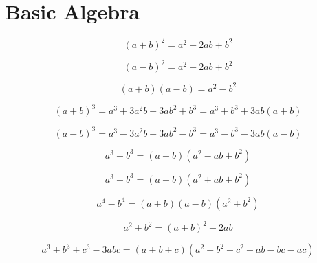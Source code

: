 \section{Basic Algebra}

\begin{equation}
\label{(a+b)2}
(a+b)^2 = a^2 + 2ab + b^2
\end{equation}

\begin{equation}
\label{(a-b)2}
(a-b)^2 = a^2 - 2ab + b^2
\end{equation}

\begin{equation}
\label{(a+b)(a-b)}
(a+b)(a-b) = a^2 - b^2
\end{equation}

\begin{equation}
\label{(a+b)3}
(a+b)^3 = a^3 + 3a^2b + 3ab^2 + b^3 = a^3 + b^3 + 3ab(a+b)
\end{equation}

\begin{equation}
\label{(a-b)3}
(a-b)^3 = a^3 - 3a^2b + 3ab^2 - b^3 = a^3 - b^3 - 3ab(a-b) 
\end{equation}

\begin{equation}
\label{a3+b3}
a^3+b^3 = (a+b)(a^2-ab+b^2) 
\end{equation}

\begin{equation}
\label{a3-b3}
a^3-b^3 = (a-b)(a^2+ab+b^2) 
\end{equation}

\begin{equation}
\label{a4-b4}
a^4-b^4 = (a+b)(a-b)(a^2+b^2) 
\end{equation}

\begin{equation}
\label{a2+b2}
a^2+b^2 = (a+b)^2 - 2ab 
\end{equation}

\begin{equation}
\label{a3+b3+c3}
a^3+b^3+c^3 - 3abc = (a+b+c)(a^2+b^2+c^2-ab-bc-ac)
\end{equation}